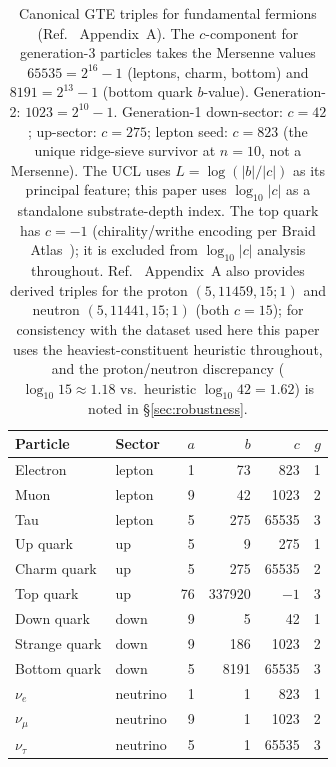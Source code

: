 \documentclass[12pt,a4paper]{article}
\begin{document}
\begin{table}[h]
\centering
\caption{Canonical GTE triples for fundamental fermions (Ref.~\cite{Spivack2026_SM_UGP} Appendix~A).
  The $c$-component for generation-3 particles takes the Mersenne values
  $65535 = 2^{16}-1$ (leptons, charm, bottom) and $8191 = 2^{13}-1$ (bottom quark $b$-value).
  Generation-2: $1023 = 2^{10}-1$.
  Generation-1 down-sector: $c=42$; up-sector: $c=275$;
  lepton seed: $c=823$ (the unique ridge-sieve survivor at $n=10$, not a Mersenne).
  The UCL uses $L = \log(|b|/|c|)$ as its principal feature; this paper uses $\log_{10}|c|$
  as a standalone substrate-depth index.
  The top quark has $c=-1$ (chirality/writhe encoding per Braid Atlas~\cite{SpivackBraidAtlas});
  it is excluded from $\log_{10}|c|$ analysis throughout.
  Ref.~\cite{Spivack2026_SM_UGP} Appendix~A also provides derived triples for the proton
  $(5,11459,15;1)$ and neutron $(5,11441,15;1)$ (both $c=15$);
  for consistency with the dataset used here this paper uses
  the heaviest-constituent heuristic throughout, and the proton/neutron discrepancy
  ($\log_{10}15\approx1.18$ vs.\ heuristic $\log_{10}42=1.62$) is noted in
  \S\ref{sec:robustness}.}
\label{tab:triples}
\small
\begin{tabular}{llrrrr}
\toprule
Particle & Sector & $a$ & $b$ & $c$ & $g$ \\
\midrule
Electron   & lepton   & 1  & 73     & 823    & 1 \\
Muon       & lepton   & 9  & 42     & 1023   & 2 \\
Tau        & lepton   & 5  & 275    & 65535  & 3 \\
\midrule
Up quark   & up       & 5  & 9      & 275    & 1 \\
Charm quark& up       & 5  & 275    & 65535  & 2 \\
Top quark  & up       & 76 & 337920 & $-1$   & 3 \\
\midrule
Down quark & down     & 9  & 5      & 42     & 1 \\
Strange quark & down  & 9  & 186    & 1023   & 2 \\
Bottom quark  & down  & 5  & 8191   & 65535  & 3 \\
\midrule
$\nu_e$    & neutrino & 1  & 1      & 823    & 1 \\
$\nu_\mu$  & neutrino & 9  & 1      & 1023   & 2 \\
$\nu_\tau$ & neutrino & 5  & 1      & 65535  & 3 \\
\bottomrule
\end{tabular}
\end{table}
\end{document}

